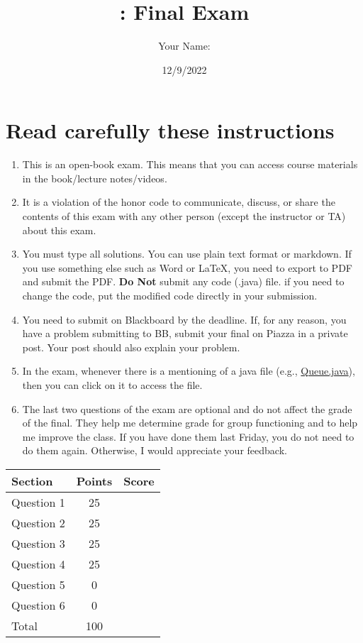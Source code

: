 \documentclass[10pt]{article}
\author{Your Name:}
\date{12/9/2022}
\title{\classname{}: Final Exam}
\begin{document}
\maketitle
\section*{Read carefully these instructions}

\begin{enumerate}
\item This is an open-book exam. This means that you can access course materials in the book/lecture notes/videos.  

\item It is a violation of the honor code to communicate, discuss, or share the contents of this exam with any other person (except the instructor or TA) about this exam.

\item You must type all solutions.  You can use plain text format or markdown.  If you use something else such as Word or LaTeX, you need to export to PDF and submit the PDF.  \textbf{Do Not} submit any code (.java) file.   if you need to change the code, put the modified code directly in your submission.  

\item You need to submit on Blackboard by the deadline. If, for any reason, you have a problem submitting to BB,  submit your final on Piazza in a private post.  Your post should also explain your problem.

\item In the exam, whenever there is a mentioning of a java file (e.g., \href{https://nguyenthanhvuh.github.io/class-oo/files/Queue.java}{Queue.java}), then you can click on it to access the file.  

\item The last two questions of the exam are optional and do not affect the grade of the final.  They help me determine grade for group functioning and to help me improve the class. If you have done them last Friday, you do not need to do them again. Otherwise, I would appreciate your feedback.
  
\end{enumerate}


\begin{center}
  \begin{tabular}{lcc}
    \toprule
    Section		&	Points	&	Score \\
    \midrule
    Question 1	&	 25	& \\
    Question 2	&	 25	& \\
    Question 3 	&	 25	& \\
    Question 4 	&	 25	& \\
    Question 5 	&	 0	& \\
    Question 6 	&	 0	& \\
    \midrule
    Total		&	100	& \\
    \bottomrule
  \end{tabular}
\end{center}
\end{document}
